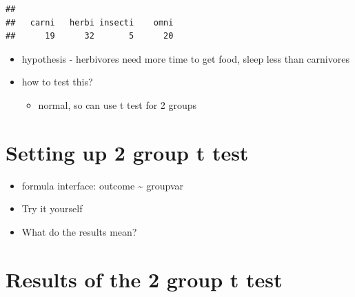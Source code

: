 \documentclass[
]{book}
\newenvironment{Shaded}{\begin{snugshade}}{\end{snugshade}}
\newcommand{\DataTypeTok}[1]{\textcolor[rgb]{0.13,0.29,0.53}{#1}}
\newcommand{\KeywordTok}[1]{\textcolor[rgb]{0.13,0.29,0.53}{\textbf{#1}}}
\newcommand{\NormalTok}[1]{#1}
\newcommand{\OperatorTok}[1]{\textcolor[rgb]{0.81,0.36,0.00}{\textbf{#1}}}
\newcommand{\StringTok}[1]{\textcolor[rgb]{0.31,0.60,0.02}{#1}}
\providecommand{\tightlist}{%
  \setlength{\itemsep}{0pt}\setlength{\parskip}{0pt}}
\begin{document}
\begin{verbatim}
## 
##   carni   herbi insecti    omni 
##      19      32       5      20
\end{verbatim}

\begin{itemize}
\tightlist
\item
  hypothesis - herbivores need more time to get food, sleep less than carnivores
\item
  how to test this?

  \begin{itemize}
  \tightlist
  \item
    normal, so can use t test for 2 groups
  \end{itemize}
\end{itemize}

\hypertarget{setting-up-2-group-t-test}{%
\section{Setting up 2 group t test}\label{setting-up-2-group-t-test}}

\begin{itemize}
\tightlist
\item
  formula interface: outcome \textasciitilde{} groupvar
\end{itemize}

\begin{Shaded}
\end{Shaded}

\begin{itemize}
\tightlist
\item
  Try it yourself
\item
  What do the results mean?
\end{itemize}

\hypertarget{results-of-the-2-group-t-test}{%
\section{Results of the 2 group t test}\label{results-of-the-2-group-t-test}}
\end{document}
